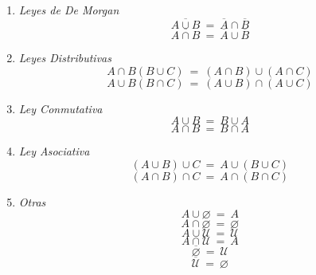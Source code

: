 \documentclass{article}
\newcommand{\eq}{\:=\:}                                 %
\begin{document}
\begin{enumerate}
    \item \emph{Leyes de De Morgan}
    \begin{equation*}
        \overline{A \cup B} \eq \overline{A} \cap \overline{B}
    \end{equation*}
    \begin{equation*}
        \overline{A \cap B} \eq \overline{A} \cup \overline{B}
    \end{equation*}
    \item \emph{Leyes Distributivas}
    \begin{equation*}
        A \cap B (B \cup C) \eq (A \cap B) \cup (A \cap C)
    \end{equation*}
    \begin{equation*}
        A \cup B (B \cap C) \eq (A \cup B) \cap (A \cup C)
    \end{equation*}
    \item \emph{Ley Conmutativa}
    \begin{equation*}
        A \cup B \eq B \cup A
    \end{equation*}
    \begin{equation*}
        A \cap B \eq B \cap A
    \end{equation*}
    \item \emph{Ley Asociativa}
    \begin{equation*}
        (A \cup B) \cup C \eq A \cup (B \cup C)
    \end{equation*}
    \begin{equation*}
        (A \cap B) \cap C \eq A \cap (B \cap C)
    \end{equation*}
    \item \emph{Otras}
    \begin{equation*}
        A \cup \varnothing \eq A
    \end{equation*}
    \begin{equation*}
        A \cap \varnothing \eq \varnothing
    \end{equation*}
    \begin{equation*}
        A \cup \mathcal{U} \eq \mathcal{U}
    \end{equation*}
    \begin{equation*}
        A \cap \mathcal{U} \eq A
    \end{equation*}
    \begin{equation*}
        \overline{\varnothing} \eq \mathcal{U}
    \end{equation*}
    \begin{equation*}
        \overline{\mathcal{U}} \eq \varnothing
    \end{equation*}
\end{enumerate}
\end{document}

